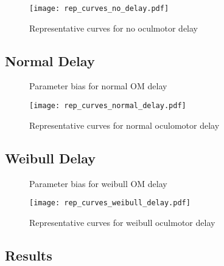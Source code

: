 \begin{figure}[H]
\centering
\texttt{[image: rep\_curves\_no\_delay.pdf]}
\caption{Representative curves for no oculmotor delay}
\label{fig:rep_curves_no_delay}
\end{figure}



\subsection{Normal Delay}

\begin{figure}[H]
\centering
\caption{Parameter bias for normal OM delay}
\label{fig:par_bias_normal_delay}
\end{figure}

\begin{figure}[H]
\centering
\texttt{[image: rep\_curves\_normal\_delay.pdf]}
\caption{Representative curves for normal oculomotor delay}
\label{fig:rep_curves_normal_delay}
\end{figure}

\subsection{Weibull Delay}


\begin{figure}[H]
\centering

\caption{Parameter bias for weibull OM delay}
\label{fig:par_bias_weibull_delay}
\end{figure}

\begin{figure}[H]
\centering
\texttt{[image: rep\_curves\_weibull\_delay.pdf]}
\caption{Representative curves for weibull oculmotor delay}
\label{fig:rep_curves_weibull_delay}
\end{figure}





\subsection{Results}

